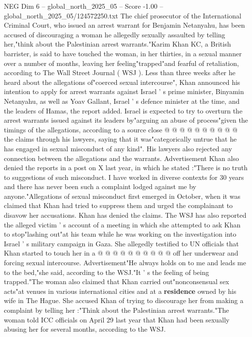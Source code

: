 \begin{textsample}{NEG Dim 6 – global\_north\_2025\_05 – Score -1.00 – global\_north\_2025\_05/124572250.txt}  \label{ex:f6_neg_410}
The chief prosecutor of the International Criminal Court, who issued an arrest warrant for Benjamin Netanyahu, has been accused of discouraging a woman he allegedly sexually assaulted by telling her,"think about the Palestinian arrest warrants."Karim Khan KC, a British barrister, is said to have touched the woman, in her thirties, in a sexual manner over a number of months, leaving her feeling"trapped"and fearful of retaliation, according to The Wall Street Journal ( WSJ ).
Less than three weeks after he heard about the allegations of"coerced sexual intercourse", Khan announced his intention to apply for arrest warrants against Israel ' s prime minister, Binyamin Netanyahu, as well as Yoav Gallant, Israel ' s defence minister at the time, and the leaders of Hamas, the report added.
Israel is expected to try to overturn the arrest warrants issued against its leaders by"arguing an abuse of process"given the timings of the allegations, according to a source close @ @ @ @ @ @ @ @ @ @ the claims through his lawyers, saying that it was"categorically untrue that he has engaged in sexual misconduct of any kind".
His lawyers also rejected any connection between the allegations and the warrants.
Advertisement Khan also denied the reports in a post on X last year, in which he stated :"There is no truth to suggestions of such misconduct.
I have worked in diverse contexts for 30 years and there has never been such a complaint lodged against me by anyone."Allegations of sexual misconduct first emerged in October, when it was claimed that Khan had tried to suppress them and urged the complainant to disavow her accusations.
Khan has denied the claims.
The WSJ has also reported the alleged victim ' s account of a meeting in which she attempted to ask Khan to stop"lashing out"at his team while he was working on the investigation into Israel ' s military campaign in Gaza.
She allegedly testified to UN officials that Khan started to touch her in a @ @ @ @ @ @ @ @ @ @ off her underwear and forcing sexual intercourse.
Advertisement"He always holds on to me and leads me to the bed,"she said, according to the WSJ."It ' s the feeling of being trapped."The woman also claimed that Khan carried out"nonconsensual sex acts"at venues in various international cities and at a \textbf{residence} owned by his wife in The Hague.
She accused Khan of trying to discourage her from making a complaint by telling her :"Think about the Palestinian arrest warrants."The woman told ICC officials on April 29 last year that Khan had been sexually abusing her for several months, according to the WSJ.

\end{textsample}

